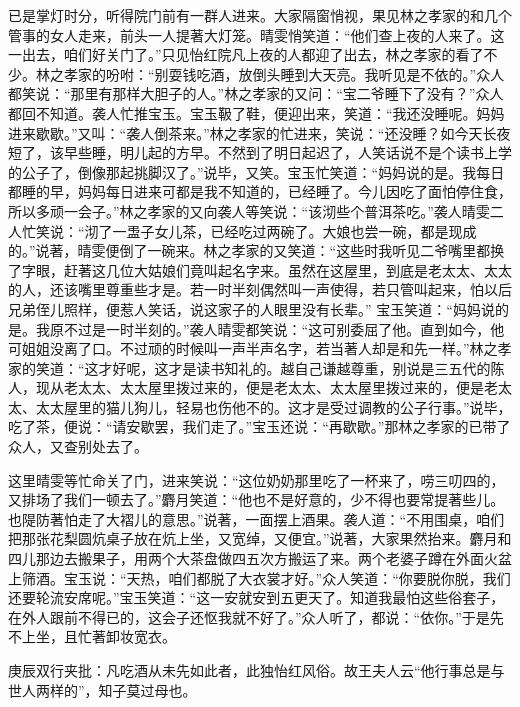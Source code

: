 \begin{parag}
    已是掌灯时分，听得院门前有一群人进来。大家隔窗悄视，果见林之孝家的和几个管事的女人走来，前头一人提著大灯笼。晴雯悄笑道：“他们查上夜的人来了。这一出去，咱们好关门了。”只见怡红院凡上夜的人都迎了出去，林之孝家的看了不少。林之孝家的吩咐：“别耍钱吃酒，放倒头睡到大天亮。我听见是不依的。”众人都笑说：“那里有那样大胆子的人。”林之孝家的又问：“宝二爷睡下了没有？”众人都回不知道。袭人忙推宝玉。宝玉靸了鞋，便迎出来，笑道：“我还没睡呢。妈妈进来歇歇。”又叫：“袭人倒茶来。”林之孝家的忙进来，笑说：“还没睡？如今天长夜短了，该早些睡，明儿起的方早。不然到了明日起迟了，人笑话说不是个读书上学的公子了，倒像那起挑脚汉了。”说毕，又笑。宝玉忙笑道：“妈妈说的是。我每日都睡的早，妈妈每日进来可都是我不知道的，已经睡了。今儿因吃了面怕停住食，所以多顽一会子。”林之孝家的又向袭人等笑说：“该沏些个普洱茶吃。”袭人晴雯二人忙笑说：“沏了一盄子女儿茶，已经吃过两碗了。大娘也尝一碗，都是现成的。”说著，晴雯便倒了一碗来。林之孝家的又笑道：“这些时我听见二爷嘴里都换了字眼，赶著这几位大姑娘们竟叫起名字来。虽然在这屋里，到底是老太太、太太的人，还该嘴里尊重些才是。若一时半刻偶然叫一声使得，若只管叫起来，怕以后兄弟侄儿照样，便惹人笑话，说这家子的人眼里没有长辈。” 宝玉笑道：“妈妈说的是。我原不过是一时半刻的。”袭人晴雯都笑说：“这可别委屈了他。直到如今，他可姐姐没离了口。不过顽的时候叫一声半声名字，若当著人却是和先一样。”林之孝家的笑道：“这才好呢，这才是读书知礼的。越自己谦越尊重，别说是三五代的陈人，现从老太太、太太屋里拨过来的，便是老太太、太太屋里拨过来的，便是老太太、太太屋里的猫儿狗儿，轻易也伤他不的。这才是受过调教的公子行事。”说毕，吃了茶，便说：“请安歇罢，我们走了。”宝玉还说：“再歇歇。”那林之孝家的已带了众人，又查别处去了。
\end{parag}


\begin{parag}
    这里晴雯等忙命关了门，进来笑说：“这位奶奶那里吃了一杯来了，唠三叨四的，又排场了我们一顿去了。”麝月笑道：“他也不是好意的，少不得也要常提著些儿。也隄防著怕走了大褶儿的意思。”说著，一面摆上酒果。袭人道：“不用围桌，咱们把那张花梨圆炕桌子放在炕上坐，又宽绰，又便宜。”说著，大家果然抬来。麝月和四儿那边去搬果子，用两个大茶盘做四五次方搬运了来。两个老婆子蹲在外面火盆上筛酒。宝玉说：“天热，咱们都脱了大衣裳才好。”众人笑道：“你要脱你脱，我们还要轮流安席呢。”宝玉笑道：“这一安就安到五更天了。知道我最怕这些俗套子，在外人跟前不得已的，这会子还怄我就不好了。”众人听了，都说：“依你。”于是先不上坐，且忙著卸妆宽衣。\begin{note}庚辰双行夹批：凡吃酒从未先如此者，此独怡红风俗。故王夫人云“他行事总是与世人两样的”，知子莫过母也。\end{note}
\end{parag}


